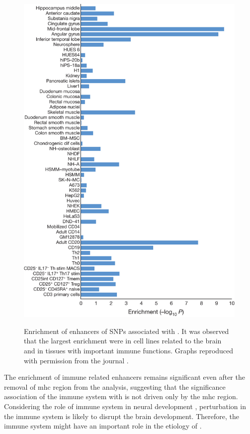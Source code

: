 	\begin{figure}
		\centering
		\caption[Enrichment of enhancers of SNPs associated with Schizophrenia]{Enrichment of enhancers of SNPs associated with . 
			It was observed that the largest enrichment were in cell lines related to the brain and in tissues with important immune functions. 
			Graphs reproduced with permission from the journal \citep{Ripke2014}.}
		\includegraphics[height=\textwidth]{figure/pgc_enrichment_tissue.jpg}
		\label{fig:pgcEnrich}
	\end{figure}
	
	The enrichment of immune related enhancers remains significant even after the removal of \gls{mhc} region from the analysis, suggesting that the significance association of the immune system with  is not driven only by the \gls{mhc} region.
	Considering the role of immune system in neural development \citep{Zhao1998,Deverman2009}, perturbation in the immune system is likely to disrupt the brain development.
	Therefore, the immune system might have an important role in the etiology of .
%	
	
